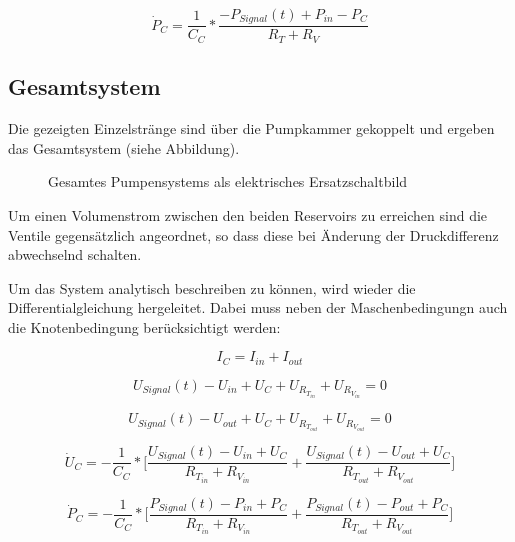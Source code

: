 \documentclass[fontsize=12pt, a4paper]{scrartcl}
\begin{document}
\begin{equation}
	\dot{P}_{C} = \frac{1}{C_{C}} * \frac{-P_{Signal}(t)+P_{in}-P_{C}}{R_{T}+R_{V}}
\end{equation}


\subsection{Gesamtsystem}

Die gezeigten Einzelstränge sind über die Pumpkammer gekoppelt und ergeben das Gesamtsystem (siehe Abbildung).


\begin{figure}[H]
	
	\caption{Gesamtes Pumpensystems als elektrisches Ersatzschaltbild}
	\label{systemcircuit}
\end{figure}

Um einen Volumenstrom zwischen den beiden Reservoirs zu erreichen sind die Ventile gegensätzlich angeordnet, so dass diese bei Änderung der Druckdifferenz abwechselnd schalten. 

Um das System analytisch beschreiben zu können, wird wieder die Differentialgleichung hergeleitet. Dabei muss neben der Maschenbedingungn auch die Knotenbedingung berücksichtigt werden:

\begin{equation}
	I_{C} = I_{in} + I_{out}
\end{equation}

\begin{equation}
	U_{Signal}(t) - U_{in} + U_{C} + U_{R_{T_{in}}} + U_{R_{V_{in}}} = 0
\end{equation}

\begin{equation}
	U_{Signal}(t) - U_{out} + U_{C} + U_{R_{T_{out}}} + U_{R_{V_{out}}} = 0
\end{equation}

\begin{equation}
	\dot{U}_{C} = - \frac{1}{C_{C}} * \biggl[\frac{U_{Signal}(t)-U_{in}+U_{C}}{R_{T_{in}}+R_{V_{in}}} + \frac{U_{Signal}(t)-U_{out}+U_{C}}{R_{T_{out}}+R_{V_{out}}}\biggr]
\end{equation}

\begin{equation}
	\dot{P}_{C} = - \frac{1}{C_{C}} * \biggl[\frac{P_{Signal}(t)-P_{in}+P_{C}}{R_{T_{in}}+R_{V_{in}}} + \frac{P_{Signal}(t)-P_{out}+P_{C}}{R_{T_{out}}+R_{V_{out}}}\biggr]
\end{equation}
\end{document}

